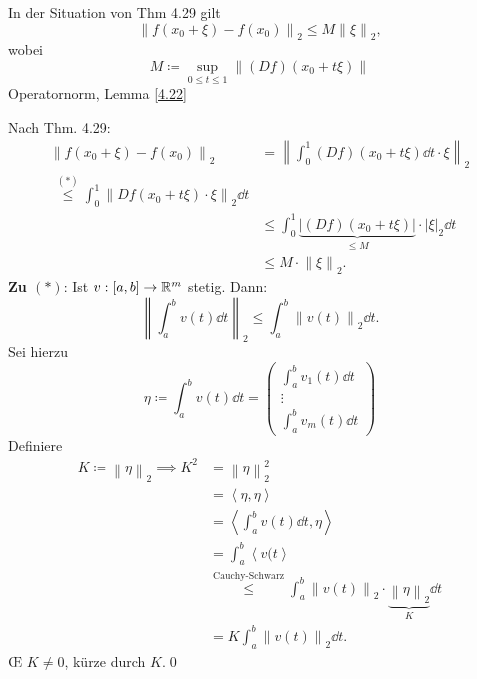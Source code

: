 \begin{theorem}[Schraukensatz]
	In der Situation von Thm 4.29 gilt
	\[
		\left\| f(x_0 + \xi) - f(x_0) \right\| _2 \leq M \left\| \xi \right\| _2, 
	\]
	wobei
	\[
		M \coloneqq  \sup_{0 \leq t \leq 1}  \left\| \left( Df \right) \left( x_0 + t \xi \right)  \right\| 
	\]
	Operatornorm, Lemma \ref{4.22}
\end{theorem}
\begin{proof*}
	Nach Thm. 4.29:
	\begin{align*}
		\left\| f(x_0 + \xi) - f(x_0) \right\| _2 &= \left\| \int_{0}^{1} \left( Df \right) \left( x_0 + t\xi \right) \dd t \cdot \xi \right\| _2 \\
		~ \overset{(*)}{\leq } \int_{0}^{1} \left\| Df (x_0 + t\xi) \cdot \xi \right\| _2 \dd t \\
		~ & \leq \int_{0}^{1} \underbrace{\left| (Df) (x_0 + t\xi) \right| }_{\leq M} \cdot \left| \xi \right| _2 \dd t \\
		~ & \leq M \cdot \left\| \xi \right\| _2.
	\end{align*}
	\textbf{Zu $ (*) $}: Ist $ v : [a, b] \to \mathbb{R} ^m $ stetig.
	Dann:
	\[
		\left\| \int_{a}^{b} v(t) \dd t \right\| _{2} \leq \int_{a}^{b} \left\| v(t) \right\| _2 \dd t.
	\]
	Sei hierzu
	\[
		\eta \coloneqq \int_{a}^{b} v(t) \dd t = \begin{pmatrix} \int_{a}^{b} v_1(t) \dd t \\ \vdots \\ \int_{a}^{b} v_m (t) \dd t \end{pmatrix} 
	\]
	Definiere
	\begin{align*}
		K \coloneqq \left\| \eta \right\| _2 \implies K^2 &= \left\| \eta \right\| _2^2 \\
		~ &= \left< \eta, \eta \right> \\
		~ &= \left< \int_{a}^{b} v(t) \dd t, \eta \right> \\
		  &= \int_{a}^{b} \left< v(t \right> \\
		  & \overset{\text{Cauchy-Schwarz} }{\leq } \int_{a}^{b} \left\| v(t) \right\| _2 \cdot \underbrace{\left\| \eta \right\| _2}_{K} \dd t \\
		  &= K \int_{a}^{b}\left\| v(t) \right\| _2 \dd t.
	\end{align*}
	\OE{} $ K \neq 0 $, kürze durch $ K $.\qed
\end{proof*}


